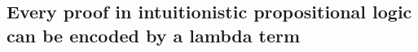 \subsection{Every proof in intuitionistic propositional logic can be encoded by a lambda term}
\label{sec:co_p2t}